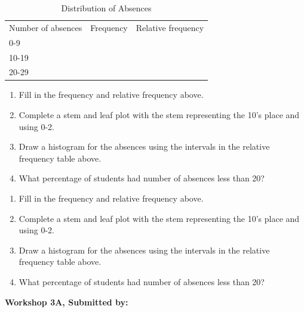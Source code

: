 \documentclass[11pt, chapterprefix=true]{scrbook}\usepackage[]{graphicx}\usepackage[]{color}
\begin{document}
\begin{exercises}
\begin{exercise}
\begin{table}[ht]
\centering
\caption{Distribution of Absences}
\begin{tabular}{@{} lcc @{}} \hline
Number of absences & Frequency & Relative frequency \\
0-9 & & \\
10-19 & & \\
20-29 & & \\ \hline
\end{tabular}
\end{table}

\begin{enumerate}
  \item	Fill in the frequency and relative frequency above.
  \item	Complete a stem and leaf plot with the stem representing the 10's place and using 0-2.
  \item	Draw a histogram for the absences using the intervals in the relative frequency table above.
  \item	What percentage of students had number of absences less than 20?
\end{enumerate}

    \end{exercise}
    \begin{solution} %

\begin{enumerate}
  \item	Fill in the frequency and relative frequency above.
  \item	Complete a stem and leaf plot with the stem representing the 10's place and using 0-2.
  \item	Draw a histogram for the absences using the intervals in the relative frequency table above.
  \item	What percentage of students had number of absences less than 20?
\end{enumerate}

    \end{solution}
    
\clearpage

    \begin{exercise}  %

    \begin{center}
\begin{flushleft}\textbf{\large \hfill Workshop 3A, Submitted by: }\end{flushleft}


\end{center}
\end{exercise}
\end{exercises}
\end{document}
